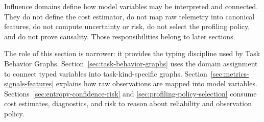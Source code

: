 Influence domains define how model variables may be interpreted and connected.
They do not define the cost estimator, do not map raw telemetry into canonical
features, do not compute uncertainty or risk, do not select the profiling policy,
and do not prove causality. Those responsibilities belong to later sections.

The role of this section is narrower: it provides the typing discipline used by
Task Behavior Graphs. Section~\ref{sec:task-behavior-graphs} uses the domain
assignment to connect typed variables into task-kind-specific graphs.
Section~\ref{sec:metrics-signals-features} explains how raw observations are
mapped into model variables. Sections~\ref{sec:entropy-confidence-risk} and
\ref{sec:profiling-policy-selection} consume cost estimates, diagnostics, and
risk to reason about reliability and observation policy.
